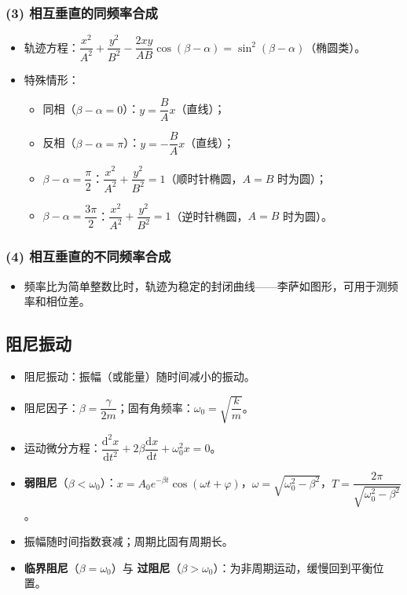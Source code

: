 \documentclass[12pt,a4paper]{ctexart}
\begin{document}
\subsubsection*{(3) 相互垂直的同频率合成}

\begin{itemize}
    \item 轨迹方程：$\dfrac{x^2}{A^2}+\dfrac{y^2}{B^2}-\dfrac{2xy}{AB}\cos(\beta-\alpha)=\sin^2(\beta-\alpha)$（椭圆类）。
    \item 特殊情形：
    \begin{itemize}
        \item 同相（$\beta-\alpha=0$）：$y=\dfrac{B}{A}x$（直线）；
        \item 反相（$\beta-\alpha=\pi$）：$y=-\dfrac{B}{A}x$（直线）；
        \item $\beta-\alpha=\dfrac{\pi}{2}$：$\dfrac{x^2}{A^2}+\dfrac{y^2}{B^2}=1$（顺时针椭圆，$A=B$ 时为圆）；
        \item $\beta-\alpha=\dfrac{3\pi}{2}$：$\dfrac{x^2}{A^2}+\dfrac{y^2}{B^2}=1$（逆时针椭圆，$A=B$ 时为圆）。
    \end{itemize}
\end{itemize}

\subsubsection*{(4) 相互垂直的不同频率合成}

\begin{itemize}
    \item 频率比为简单整数比时，轨迹为稳定的封闭曲线——李萨如图形，可用于测频率和相位差。
\end{itemize}

\subsection{阻尼振动}

\begin{itemize}
    \item 阻尼振动：振幅（或能量）随时间减小的振动。
    \item 阻尼因子：$\beta=\dfrac{\gamma}{2m}$；固有角频率：$\omega_0=\sqrt{\dfrac{k}{m}}$。
    \item 运动微分方程：$\dfrac{\mathrm{d}^2x}{\mathrm{d}t^2}+2\beta\dfrac{\mathrm{d}x}{\mathrm{d}t}+\omega_0^2 x=0$。
    \item \textbf{弱阻尼}（$\beta<\omega_0$）：$x=A_0 e^{-\beta t}\cos(\omega t+\varphi)$，$\omega=\sqrt{\omega_0^2-\beta^2}$，$T=\dfrac{2\pi}{\sqrt{\omega_0^2-\beta^2}}$。
    \item 振幅随时间指数衰减；周期比固有周期长。
    \item \textbf{临界阻尼}（$\beta=\omega_0$）与 \textbf{过阻尼}（$\beta>\omega_0$）：为非周期运动，缓慢回到平衡位置。
\end{itemize}
\end{document}
